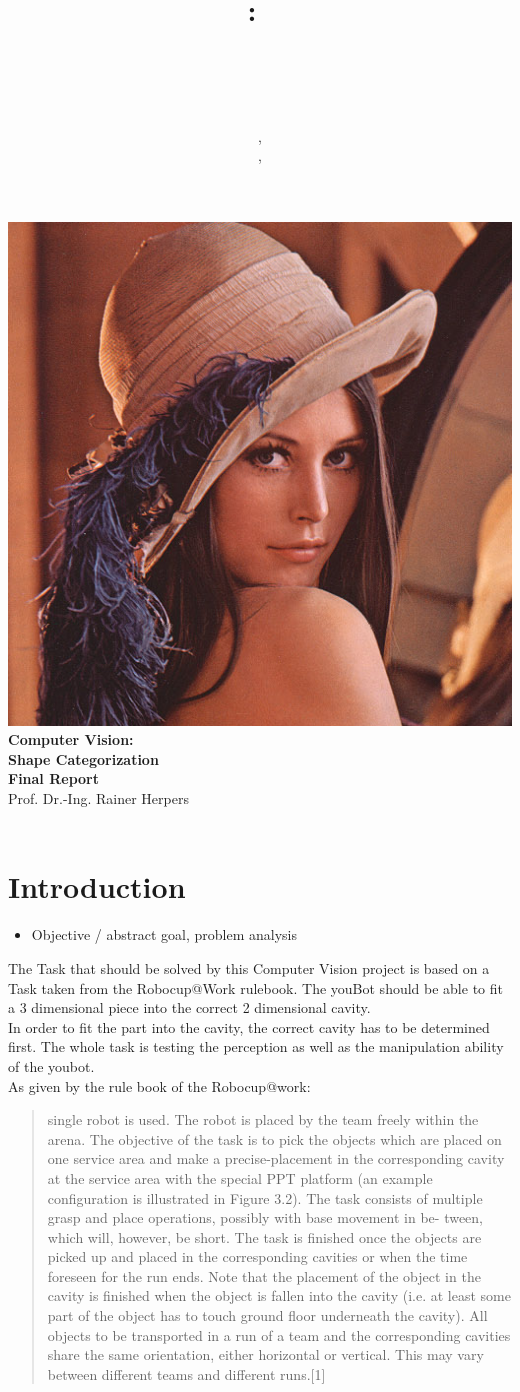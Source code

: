 \documentclass{article}
\title{
\vspace{2in}
\textmd{\textbf{\hmwkClass:\ \\ \hmwkTitle}}\\
\vspace{0.1in}\large{\hmwkClassInstructor\ }
\vspace{3in}
}
\author{\textbf{\hmwkAuthorName}, \hmwkfirstmat\\ \textbf{\hmwksecondauthor}, \hmwksecondmat}
\date{} %
\newcommand{\hmwkTitle}{Shape Categorization\\Final Report} %
\newcommand{\hmwkClass}{Computer Vision} %
\newcommand{\hmwkClassInstructor}{Prof. Dr.-Ing. Rainer Herpers} %
\newcommand{\hmwkimage}{\centering\includegraphics[draft=false, scale = 0.5]{images/lenna.png}}
\begin{document}
\begin{titlepage}
\hmwkimage\\
\vspace{1in}
\textmd{\Huge\textbf{\hmwkClass:\ \\ \hmwkTitle}}\\
\vspace{0.1in}\large{\hmwkClassInstructor\ }
\vspace{3in}\\
\theauthor\
\thispagestyle{empty}
\end{titlepage}


\setcounter{page}{1}

\tableofcontents

\newpage

\section{Introduction}

\begin{itemize}
\item Objective / abstract goal, problem analysis
\end{itemize}

The Task that should be solved by this Computer Vision project is based on a Task taken from the Robocup@Work rulebook. The youBot should be able to fit a 3 dimensional piece into the correct 2 dimensional cavity.\\
In order to fit the part into the cavity, the correct cavity has to be determined first. The whole task is testing the perception as well as the manipulation ability of the youbot.\\
As given by the rule book of the Robocup@work:

\begin{quote}

single robot is used.  The robot is placed by the team freely within the arena.  The
objective of the task is to pick the objects which are placed on one service area and make a
precise-placement in the corresponding cavity at the service area with the special PPT platform
(an example configuration is illustrated in Figure
3.2).
The task consists of multiple grasp and place operations, possibly with base movement in be-
tween, which will, however, be short.  The task is finished once the objects are picked up and
placed in the corresponding cavities or when the time foreseen for the run ends.  Note that the
placement of the object in the cavity is finished when the object is fallen into the cavity (i.e.  at
least some part of the object has to touch ground floor underneath the cavity).
All objects to be transported in a run of a team and the corresponding cavities share the same
orientation, either horizontal or vertical.  This may vary between different teams and different
runs.[1]\\

\end{quote}
\end{document}
